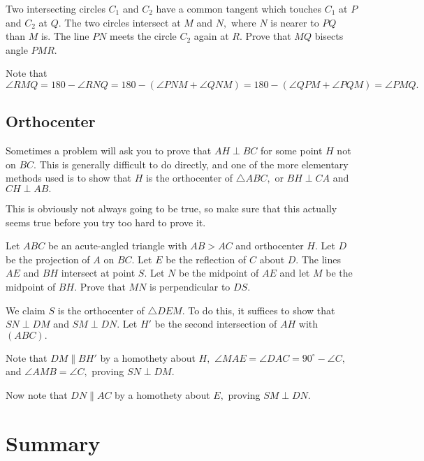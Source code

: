 \begin{exam}
Two intersecting circles $C_1$ and $C_2$ have a common tangent which touches $C_1$ at $P$ and $C_2$ at $Q.$ The two circles intersect at $M$ and $N,$ where $N$ is nearer to $PQ$ than $M$ is. The line $PN$ meets the circle $C_2$ again at $R.$ Prove that $MQ$ bisects angle $PMR.$
\end{exam}

\begin{sol}
Note that $\angle RMQ=180-\angle RNQ=180-(\angle PNM+\angle QNM)=180-(\angle QPM+\angle PQM)=\angle PMQ.$
\end{sol}

\subsection{Orthocenter}
Sometimes a problem will ask you to prove that $AH\perp BC$ for some point $H$ not on $BC.$ This is generally difficult to do directly, and one of the more elementary methods used is to show that $H$ is the orthocenter of $\triangle ABC,$ or $BH\perp CA$ and $CH\perp AB.$

This is obviously not always going to be true, so make sure that this actually seems true before you try too hard to prove it.

\begin{exam}
Let $ABC$ be an acute-angled triangle with $AB> AC$ and orthocenter $H$. Let $D$ be the projection of $A$ on $BC$. Let $E$ be the reflection of $C$ about $D$. The lines $AE$ and $BH$ intersect at point $S$. Let $N$ be the midpoint of $AE$ and let $M$ be the midpoint of $BH$. Prove that $MN$ is perpendicular to $DS$.
\end{exam}

\begin{sol}
We claim $S$ is the orthocenter of $\triangle DEM.$ To do this, it suffices to show that $SN\perp DM$ and $SM\perp DN.$ Let $H'$ be the second intersection of $AH$ with $(ABC).$

Note that $DM\parallel BH'$ by a homothety about $H,$ $\angle MAE=\angle DAC=90^{\circ}-\angle C,$ and $\angle AMB=\angle C,$ proving $SN\perp DM.$

Now note that $DN\parallel AC$ by a homothety about $E,$ proving $SM\perp DN.$
\end{sol}

\section{Summary}

